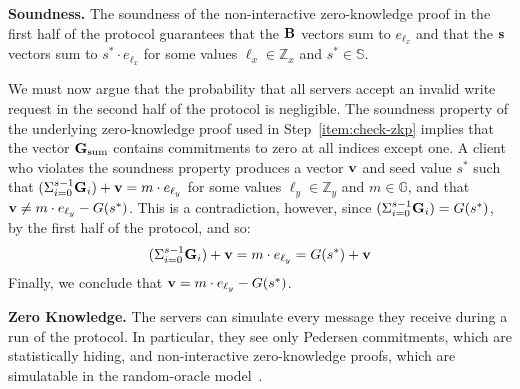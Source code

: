 \documentclass[10pt,twocolumn]{article}
\newcommand{\Z}{\mathbb{Z}}
\newcommand{\Seed}{\mathbb{S}}
\newcommand{\G}{\mathbb{G}}
\newcommand{\nicepara}[1]{\medskip\noindent\textbf{#1.}}
\begin{document}
{\nicepara{Soundness}
The soundness of the non-interactive zero-knowledge proof 
in the first half of the protocol guarantees that
the ${\bf B}$ vectors sum to $e_{\ell_x}$ and that
the ${\bf s}$ vectors sum to $s^* \cdot e_{\ell_x}$ for
some values $\ell_x \in \Z_x$ and $s^* \in \Seed$.

We must now argue that the probability that all servers
accept an invalid write request in the second half of the 
protocol is negligible.
The soundness property of the underlying
zero-knowledge proof used in Step~\ref{item:check-zkp}
implies that the vector ${\bf G}_\textrm{sum}$ contains
commitments to zero at all indices except one.
A client who violates the soundness property produces
a vector ${\bf v}$ and seed value $s^*$ such
that $(\Sigma_{i=0}^{s-1} {\bf G}_i) + {\bf v} = m \cdot e_{\ell_y}$
for some values $\ell_y \in \Z_y$ and $m\in\G$, and that
${\bf v} \neq m \cdot e_{\ell_y} - G(s^*)$.
This is a contradiction, however, since 
$(\Sigma_{i=0}^{s-1} {\bf G}_i) = G(s^*)$, by the first
half of the protocol, and so:
\begin{align*}
(\Sigma_{i=0}^{s-1} {\bf G}_i) + {\bf v} = m \cdot e_{\ell_y} = G(s^*) + {\bf v}
\end{align*}
Finally, we conclude that ${\bf v} = m \cdot e_{\ell_y} - G(s^*)$.

\nicepara{Zero Knowledge}
The servers can simulate every message they receive during
a run of the protocol.
In particular, they see only Pedersen commitments, which
are statistically hiding, and non-interactive zero-knowledge
proofs, which are simulatable in the random-oracle 
model~\cite{bellare1993random}.

 }
\end{document}
